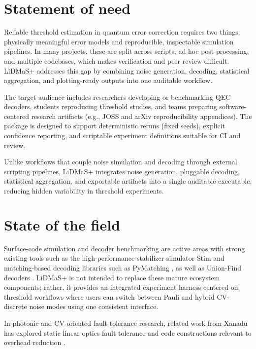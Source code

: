 \documentclass[
]{article}
\begin{document}
\section{Statement of need}\label{statement-of-need}

Reliable threshold estimation in quantum error correction requires two
things: physically meaningful error models and reproducible, inspectable
simulation pipelines. In many projects, these are split across scripts,
ad hoc post-processing, and multiple codebases, which makes verification
and peer review difficult. LiDMaS+ addresses this gap by combining noise
generation, decoding, statistical aggregation, and plotting-ready
outputs into one auditable workflow.

The target audience includes researchers developing or benchmarking QEC
decoders, students reproducing threshold studies, and teams preparing
software-centered research artifacts (e.g., JOSS and arXiv
reproducibility appendices). The package is designed to support
deterministic reruns (fixed seeds), explicit confidence reporting, and
scriptable experiment definitions suitable for CI and review.

Unlike workflows that couple noise simulation and decoding through
external scripting pipelines, LiDMaS+ integrates noise generation,
pluggable decoding, statistical aggregation, and exportable artifacts
into a single auditable executable, reducing hidden variability in
threshold experiments.

\section{State of the field}\label{state-of-the-field}

Surface-code simulation and decoder benchmarking are active areas with
strong existing tools such as the high-performance stabilizer simulator
Stim \citep{stim2021} and matching-based decoding libraries such as
PyMatching \citep{pymatching2021}, as well as Union-Find decoders
\citep{unionfind2017}. LiDMaS+ is not intended to replace these mature
ecosystem components; rather, it provides an integrated experiment
harness centered on threshold workflows where users can switch between
Pauli and hybrid CV-discrete noise modes using one consistent interface.

In photonic and CV-oriented fault-tolerance research, related work from
Xanadu has explored static linear-optics fault tolerance and code
constructions relevant to overhead reduction
\citep{tzitrin2021static, sabo2024weightreduced}.
\end{document}
